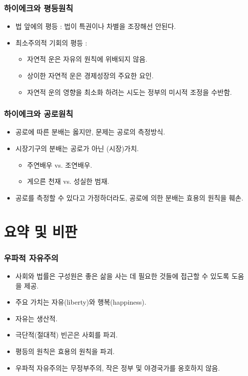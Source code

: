 \documentclass[aspectratio=169,xcolor=dvipsnames,handout]{beamer}
\begin{document}
\begin{frame}[<+->]
\frametitle{하이에크와 평등원칙}
    \begin{itemize}
        \item 법 앞에의 평등 : 법이 특권이나 차별을 조장해선 안된다. 
        \item 최소주의적 기회의 평등 :
        \begin{itemize}
            \item  자연적 운은 자유의 원칙에 위배되지 않음.
            \item  상이한 자연적 운은 경제성장의 주요한 요인.
            \item  자연적 운의 영향을 최소화 하려는 시도는 정부의 미시적 조정을 수반함.
        \end{itemize}
    \end{itemize}
\end{frame}

\begin{frame}[<+->]
\frametitle{하이에크와 공로원칙}
    \begin{itemize}
        \item 공로에 따른 분배는 옳지만, 문제는 공로의 측정방식. 
        \item 시장기구의 분배는 공로가 아닌 (시장)가치.
        \begin{itemize}
            \item 주연배우 vs. 조연배우. 
            \item 게으른 천재 vs. 성실한 범재.
        \end{itemize}
        \item  공로를 측정할 수 있다고 가정하더라도, 공로에 의한 분배는 효용의 원칙을 훼손.
    \end{itemize}
\end{frame}

\section{요약 및 비판}
\begin{frame}[<+->]
\frametitle{우파적 자유주의}
    \begin{itemize}
        \item 사회와 법률은 구성원은 좋은 삶을 사는 데 필요한 것들에 접근할 수 있도록 도움을 제공.
        \item 주요 가치는 자유(liberty)와 행복(happiness).
        \item 자유는 생산적.
        \item 극단적(절대적) 빈곤은 사회를 파괴.
        \item 평등의 원칙은 효용의 원칙을 파괴.
        \item 우파적 자유주의는 무정부주의, 작은 정부 및 야경국가를 옹호하지 않음.
    \end{itemize}
\end{frame}
\end{document}

